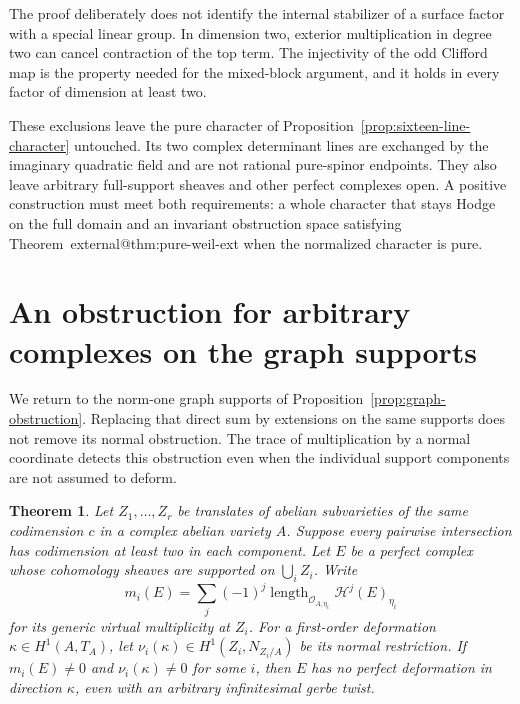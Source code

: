 \documentclass[11pt]{article}
\makeatletter
\providecommand{\compref}[1]{\csname external@#1\endcsname}
\newtheorem{theorem}{Theorem}[section]
\theoremstyle{definition}
\theoremstyle{remark}
\makeatother
\begin{document}
The proof deliberately does not identify the internal stabilizer
of a surface factor with a special linear group. In dimension two,
exterior multiplication in degree two can cancel contraction of the
top term. The injectivity of the odd Clifford map is the property
needed for the mixed-block argument, and it holds in every factor
of dimension at least two.

These exclusions leave the pure character of Proposition~\ref{prop:sixteen-line-character} untouched. Its two complex determinant lines are exchanged by the imaginary quadratic field and are not rational pure-spinor endpoints. They also leave arbitrary full-support sheaves and other perfect complexes open. A positive construction must meet both requirements: a whole character that stays Hodge on the full domain and an invariant obstruction space satisfying Theorem~\compref{thm:pure-weil-ext} when the normalized character is pure.
\section{An obstruction for arbitrary complexes on the graph supports}
\label{sec:localized-support}
We return to the norm-one graph supports of Proposition~\ref{prop:graph-obstruction}. Replacing that direct sum by extensions on the same supports does not remove its normal obstruction. The trace of multiplication by a normal coordinate detects this obstruction even when the individual support components are not assumed to deform.

\begin{theorem}\label{thm:localized-support}
Let $Z_1,\ldots,Z_r$ be translates of abelian subvarieties of the same codimension $c$ in a complex abelian variety $A$. Suppose every pairwise intersection has codimension at least two in each component. Let $E$ be a perfect complex whose cohomology sheaves are supported on $\bigcup_iZ_i$. Write
\[
 m_i(E)=\sum_j(-1)^j
 \operatorname{length}_{\mathcal O_{A,\eta_i}}
 \mathcal H^j(E)_{\eta_i}
\]
for its generic virtual multiplicity at $Z_i$. For a first-order deformation $\kappa\in H^1(A,T_A)$, let $\nu_i(\kappa)\in H^1(Z_i,N_{Z_i/A})$ be its normal restriction. If $m_i(E)\ne0$ and $\nu_i(\kappa)\ne0$ for some $i$, then $E$ has no perfect deformation in direction $\kappa$, even with an arbitrary infinitesimal gerbe twist.
\end{theorem}
\end{document}
